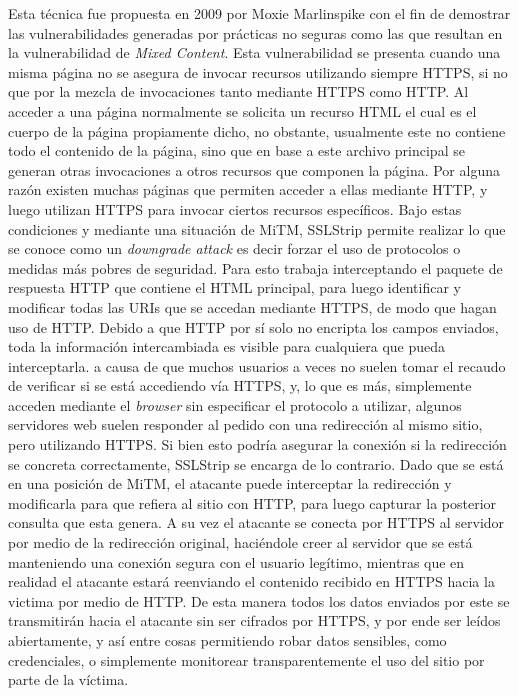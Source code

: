 \documentclass[10pt,a4paper]{article}
\begin{document}
Esta técnica fue propuesta en 2009 por Moxie Marlinspike con el fin de demostrar las vulnerabilidades generadas por prácticas no seguras como las que resultan en la vulnerabilidad de \textit{Mixed Content}. Esta vulnerabilidad se presenta cuando una misma página no se asegura de invocar recursos utilizando siempre HTTPS, si no que por la mezcla de invocaciones tanto mediante HTTPS como HTTP. Al acceder a una página normalmente se solicita un recurso HTML el cual es el cuerpo de la página propiamente dicho, no obstante, usualmente este no contiene todo el contenido de la página, sino que en base a este archivo principal se generan otras invocaciones a otros recursos que componen la página. Por alguna razón existen muchas páginas que permiten acceder a ellas mediante HTTP, y luego utilizan HTTPS para invocar ciertos recursos específicos. Bajo estas condiciones y mediante una situación de MiTM, SSLStrip permite realizar lo que se conoce como un \textit{downgrade attack} es decir forzar el uso de protocolos o medidas más pobres de seguridad. Para esto trabaja interceptando el paquete de respuesta HTTP que contiene el HTML principal, para luego identificar y modificar todas las URIs que se accedan mediante HTTPS, de modo que hagan uso de HTTP. Debido a que HTTP por sí solo no encripta los campos enviados, toda la información intercambiada es visible para cualquiera que pueda interceptarla. a causa de que muchos usuarios a veces no suelen tomar el recaudo de verificar si se está accediendo vía HTTPS, y, lo que es más, simplemente acceden mediante el \textit{browser} sin especificar el protocolo a utilizar, algunos servidores web suelen responder al pedido con una redirección al mismo sitio, pero utilizando HTTPS. Si bien esto podría asegurar la conexión si la redirección se concreta correctamente, SSLStrip se encarga de lo contrario. Dado que se está en una posición de MiTM, el atacante puede interceptar la redirección y modificarla para que refiera al sitio con HTTP, para luego capturar la posterior consulta que esta genera. A su vez el atacante se conecta por HTTPS al servidor por medio de la redirección original, haciéndole creer al servidor que se está manteniendo una conexión segura con el usuario legítimo, mientras que en realidad el atacante estará reenviando el contenido recibido en HTTPS hacia la victima por medio de HTTP. De esta manera todos los datos enviados por este se transmitirán hacia el atacante sin ser cifrados por HTTPS, y por ende ser leídos abiertamente, y así entre cosas permitiendo robar datos sensibles, como credenciales, o simplemente monitorear transparentemente el uso del sitio por parte de la víctima.
\end{document}

